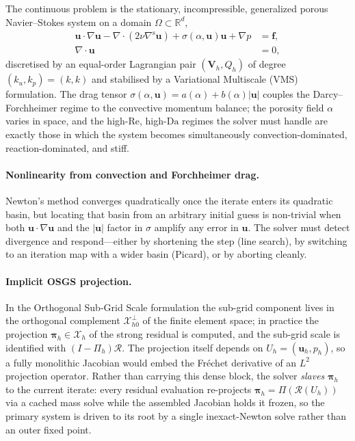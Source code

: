 \documentclass{article}
\begin{document}
The continuous problem is the stationary, incompressible, generalized
porous Navier--Stokes system on a domain $\Omega \subset \mathbb{R}^d$,
\begin{equation}
    \label{eq:strong}
    \begin{aligned}
    \boldsymbol{u} \cdot \nabla \boldsymbol{u}
        - \nabla \cdot (2 \nu \nabla^{\mathrm{s}} \boldsymbol{u})
        + \sigma(\alpha, \boldsymbol{u}) \boldsymbol{u}
        + \nabla p
        &= \boldsymbol{f}, \\
    \nabla \cdot \boldsymbol{u} &= 0,
    \end{aligned}
\end{equation}
discretised by an equal-order Lagrangian pair $(\boldsymbol{V}_h, Q_h)$
of degree $(k_u, k_p) = (k, k)$ and stabilised by a Variational
Multiscale (VMS) formulation. The drag tensor
$\sigma(\alpha, \boldsymbol{u}) = a(\alpha) + b(\alpha) |\boldsymbol{u}|$
couples the Darcy--Forchheimer regime to the convective momentum
balance; the porosity field $\alpha$ varies in space, and the
high-$\mathrm{Re}$, high-$\mathrm{Da}$ regimes the solver must handle
are exactly those in which the system becomes simultaneously
convection-dominated, reaction-dominated, and stiff.

\paragraph{Nonlinearity from convection and Forchheimer drag.}  Newton's
method converges quadratically once the iterate enters its quadratic
basin, but locating that basin from an arbitrary initial guess is
non-trivial when both $\boldsymbol{u}\cdot\nabla\boldsymbol{u}$ and the
$|\boldsymbol{u}|$ factor in $\sigma$ amplify any error in
$\boldsymbol{u}$. The solver must detect divergence and respond---either
by shortening the step (line search), by switching to an iteration map
with a wider basin (Picard), or by aborting cleanly.

\paragraph{Implicit OSGS projection.}  In the Orthogonal Sub-Grid Scale
formulation the sub-grid component lives in the orthogonal complement
$\mathcal{X}_{h0}^{\perp}$ of the finite element space; in practice the
projection $\boldsymbol{\pi}_h \in \mathcal{X}_h$ of the strong residual
is computed, and the sub-grid scale is identified with
$(I-\Pi_h)\mathcal{R}$. The projection itself depends on
$U_h = (\boldsymbol{u}_h, p_h)$, so a fully monolithic Jacobian would
embed the Fr\'echet derivative of an $L^2$ projection operator. Rather
than carrying this dense block, the solver \emph{slaves}
$\boldsymbol{\pi}_h$ to the current iterate: every residual evaluation
re-projects $\boldsymbol{\pi}_h = \Pi(\mathcal{R}(U_h))$ via a cached
mass solve while the assembled Jacobian holds it frozen, so the primary
system is driven to its root by a single inexact-Newton solve rather
than an outer fixed point.
\end{document}
